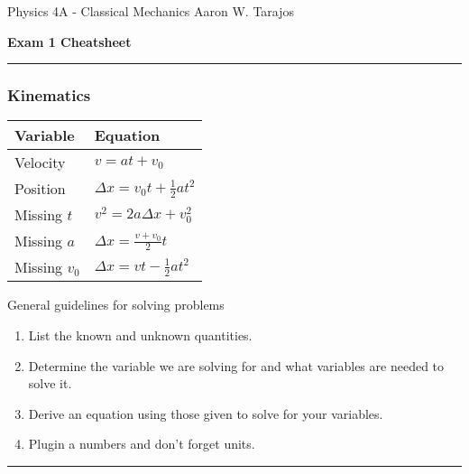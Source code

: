 \documentclass{article}
\begin{document}
\noindent
Physics 4A - Classical Mechanics \hfill Aaron W. Tarajos
\begin{center}
	\textbf{Exam 1 Cheatsheet}
\end{center}

\noindent\rule{\textwidth}{0.4pt}

\subsubsection*{Kinematics}
\begin{minipage}{0.4\textwidth}
    \begin{tabular}{|l|l|}
        \hline
        Variable & Equation \\
        \hline
        Velocity & $v = at + v_0$ \\
        Position & $\Delta x = v_0t + \frac{1}{2}at^2$ \\
        Missing $t$ & $v^2 = 2a\Delta x + v_0^2$ \\
        Missing $a$ & $\Delta x = \frac{v +v_0}{2}t$ \\
        Missing $v_0$ & $\Delta x = vt - \frac{1}{2}at^2$ \\
        \hline
    \end{tabular}
\end{minipage}
\begin{minipage}{0.4\textwidth}
General guidelines for solving problems
    \begin{enumerate}[left=0pt]
        \item List the known and unknown quantities.
        \item Determine the variable we are solving for and what variables are needed to solve it.
        \item Derive an equation using those given to solve for your variables.
        \item Plugin a numbers and don't forget units.
	\end{enumerate}
\end{minipage}
\hrule
\end{document}
